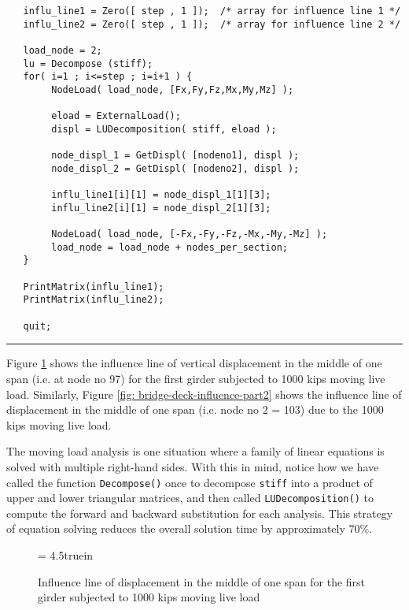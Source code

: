 \begin{footnotesize}
\begin{verbatim}
   influ_line1 = Zero([ step , 1 ]);  /* array for influence line 1 */
   influ_line2 = Zero([ step , 1 ]);  /* array for influence line 2 */

   load_node = 2;
   lu = Decompose (stiff);
   for( i=1 ; i<=step ; i=i+1 ) {
        NodeLoad( load_node, [Fx,Fy,Fz,Mx,My,Mz] );

        eload = ExternalLoad();
        displ = LUDecomposition( stiff, eload );

        node_displ_1 = GetDispl( [nodeno1], displ );
        node_displ_2 = GetDispl( [nodeno2], displ );

        influ_line1[i][1] = node_displ_1[1][3];
        influ_line2[i][1] = node_displ_2[1][3];

        NodeLoad( load_node, [-Fx,-Fy,-Fz,-Mx,-My,-Mz] );
        load_node = load_node + nodes_per_section;
   }

   PrintMatrix(influ_line1);
   PrintMatrix(influ_line2);

   quit;
\end{verbatim}
\rule{6.25 in}{0.035 in}
\end{footnotesize}

\vspace{0.25 in}\noindent
Figure \ref{fig: bridge-deck-influence-part1} shows the influence line of
vertical displacement in the middle of one span (i.e. at node no 97)
for the first girder subjected to 1000 kips moving live load.
Similarly, Figure \ref{fig: bridge-deck-influence-part2} shows
the influence line of displacement in the middle of one span (i.e. node no 2 = 103)
due to the 1000 kips moving live load.

\vspace{0.15 in}
\noindent\hspace{0.50 in}
The moving load analysis is one situation where a family of
linear equations is solved with multiple right-hand sides.
With this in mind, notice how we have called the function
{\tt Decompose()} once to decompose {\tt stiff} into
a product of upper and lower triangular matrices,
and then called {\tt LUDecomposition()} to compute the
forward and backward substitution for each analysis.
This strategy of equation solving reduces the overall solution
time by approximately 70\%.

\clearpage
\begin{figure}[th]
\epsfxsize= 4.5truein
\centerline{}
\vspace{0.20 in}
\caption{Influence line of displacement in the middle of one span
for the first girder subjected to 1000 kips moving live load}
\label{fig: bridge-deck-influence-part1}
\end{figure}

